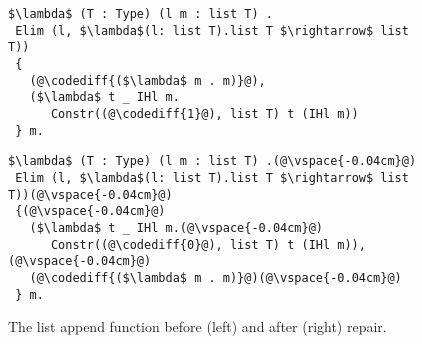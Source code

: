 \begin{figure}
\begin{minipage}{0.48\textwidth}
\begin{lstlisting}
$\lambda$ (T : Type) (l m : list T) .
 Elim (l, $\lambda$(l: list T).list T $\rightarrow$ list T))
 {
   (@\codediff{($\lambda$ m . m)}@),
   ($\lambda$ t _ IHl m.
      Constr((@\codediff{1}@), list T) t (IHl m))
 } m.
\end{lstlisting}
\end{minipage}
\hfill
\begin{minipage}{0.48\textwidth}
\begin{lstlisting}
$\lambda$ (T : Type) (l m : list T) .(@\vspace{-0.04cm}@)
 Elim (l, $\lambda$(l: list T).list T $\rightarrow$ list T))(@\vspace{-0.04cm}@)
 {(@\vspace{-0.04cm}@)
   ($\lambda$ t _ IHl m.(@\vspace{-0.04cm}@)
      Constr((@\codediff{0}@), list T) t (IHl m)),(@\vspace{-0.04cm}@)
   (@\codediff{($\lambda$ m . m)}@)(@\vspace{-0.04cm}@)
 } m.
\end{lstlisting}
\end{minipage}
\caption{The list append function before (left) and after (right) repair.}
\label{fig:appswap1}
\end{figure}

